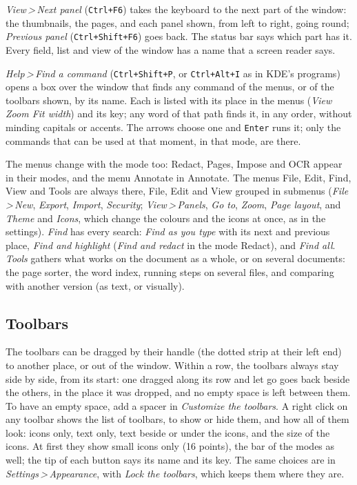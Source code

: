 \documentclass[12pt,
              article,
              oneside
              ]{memoir}
\newcommand*{\menu}[1]{\textit{#1}}
\newcommand*{\then}{\,>\,}
\newcommand*{\key}[1]{\texttt{#1}}
\begin{document}
%
\menu{View\then Next panel} (\key{Ctrl+F6}) takes the keyboard to the next
part of the window: the thumbnails, the pages, and each panel shown, from
left to right, going round; \menu{Previous panel} (\key{Ctrl+Shift+F6})
goes back. The status bar says which part has it. Every field, list and
view of the window has a name that a screen reader says.

%
\menu{Help\then Find a command} (\key{Ctrl+Shift+P}, or \key{Ctrl+Alt+I} as in KDE's programs)
opens a box over the window that finds any command of the menus, or of the
toolbars shown, by its name. Each is listed with its place in the menus
(\menu{View \textrightarrow{} Zoom \textrightarrow{} Fit width}) and its
key; any word of that path finds it, in any order, without minding capitals
or accents. The arrows choose one and \key{Enter} runs it; only the
commands that can be used at that moment, in that mode, are there.

%
The menus change with the mode too: Redact, Pages, Impose and OCR appear
in their modes, and the menu Annotate in Annotate. The menus File, Edit,
Find, View and Tools are always there, File, Edit and View grouped in
submenus (\menu{File\then New}, \menu{Export}, \menu{Import},
\menu{Security}; \menu{View\then Panels}, \menu{Go to}, \menu{Zoom},
\menu{Page layout}, and \menu{Theme} and \menu{Icons}, which change the
colours and the icons at once, as in the settings). \menu{Find} has every search: \menu{Find as you
type} with its next and previous place, \menu{Find and highlight}
(\menu{Find and redact} in the mode Redact), and \menu{Find all}. \menu{Tools} gathers what works on the document as a
whole, or on several documents: the page sorter, the word index, running
steps on several files, and comparing with another version (as text, or
visually).

\subsection{Toolbars}

%
The toolbars can be dragged by their handle (the dotted strip at their
left end) to another place, or out of the window. Within a row, the
toolbars always stay side by side, from its start: one dragged along its
row and let go goes back beside the others, in the place it was dropped,
and no empty space is left between them. To have an empty space, add a
spacer in \menu{Customize the toolbars}. A right click on any toolbar shows the list of toolbars, to
show or hide them, and how all of them look: icons only, text only, text
beside or under the icons, and the size of the icons. At first they show
small icons only (16 points), the bar of the modes as well; the tip of each
button says its name and its key. The same choices are
in \menu{Settings\then Appearance}, with \menu{Lock the toolbars}, which
keeps them where they are.
\end{document}
